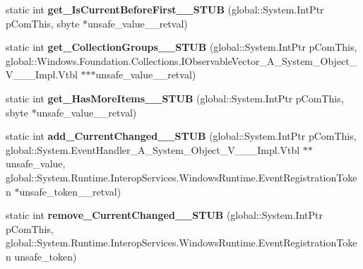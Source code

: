 \begin{DoxyCompactItemize}
\item 
\mbox{\label{struct_windows_1_1_u_i_1_1_xaml_1_1_data_1_1_i_collection_view_____impl_1_1_vtbl_aec02e603fdba0583cfcf5bc039d82490}} 
static int {\bfseries get\+\_\+\+Is\+Current\+Before\+First\+\_\+\+\_\+\+S\+T\+UB} (global\+::\+System.\+Int\+Ptr p\+Com\+This, sbyte $\ast$unsafe\+\_\+value\+\_\+\+\_\+retval)
\item 
\mbox{\label{struct_windows_1_1_u_i_1_1_xaml_1_1_data_1_1_i_collection_view_____impl_1_1_vtbl_a0c0e03b6849e9f9c499aa5e1c79c40c2}} 
static int {\bfseries get\+\_\+\+Collection\+Groups\+\_\+\+\_\+\+S\+T\+UB} (global\+::\+System.\+Int\+Ptr p\+Com\+This, global\+::\+Windows.\+Foundation.\+Collections.\+I\+Observable\+Vector\+\_\+\+A\+\_\+\+System\+\_\+\+Object\+\_\+\+V\+\_\+\+\_\+\+\_\+\+Impl.\+Vtbl $\ast$$\ast$$\ast$unsafe\+\_\+value\+\_\+\+\_\+retval)
\item 
\mbox{\label{struct_windows_1_1_u_i_1_1_xaml_1_1_data_1_1_i_collection_view_____impl_1_1_vtbl_a4d0a63b9203787ac905f828cba617214}} 
static int {\bfseries get\+\_\+\+Has\+More\+Items\+\_\+\+\_\+\+S\+T\+UB} (global\+::\+System.\+Int\+Ptr p\+Com\+This, sbyte $\ast$unsafe\+\_\+value\+\_\+\+\_\+retval)
\item 
\mbox{\label{struct_windows_1_1_u_i_1_1_xaml_1_1_data_1_1_i_collection_view_____impl_1_1_vtbl_a538d10f0291c1aa83780c1bb92ed092b}} 
static int {\bfseries add\+\_\+\+Current\+Changed\+\_\+\+\_\+\+S\+T\+UB} (global\+::\+System.\+Int\+Ptr p\+Com\+This, global\+::\+System.\+Event\+Handler\+\_\+\+A\+\_\+\+System\+\_\+\+Object\+\_\+\+V\+\_\+\+\_\+\+\_\+\+Impl.\+Vtbl $\ast$$\ast$unsafe\+\_\+value, global\+::\+System.\+Runtime.\+Interop\+Services.\+Windows\+Runtime.\+Event\+Registration\+Token $\ast$unsafe\+\_\+token\+\_\+\+\_\+retval)
\item 
\mbox{\label{struct_windows_1_1_u_i_1_1_xaml_1_1_data_1_1_i_collection_view_____impl_1_1_vtbl_a42ec13d84af228c36bee08d16e9537dd}} 
static int {\bfseries remove\+\_\+\+Current\+Changed\+\_\+\+\_\+\+S\+T\+UB} (global\+::\+System.\+Int\+Ptr p\+Com\+This, global\+::\+System.\+Runtime.\+Interop\+Services.\+Windows\+Runtime.\+Event\+Registration\+Token unsafe\+\_\+token)
$$
\end{DoxyCompactItemize}
